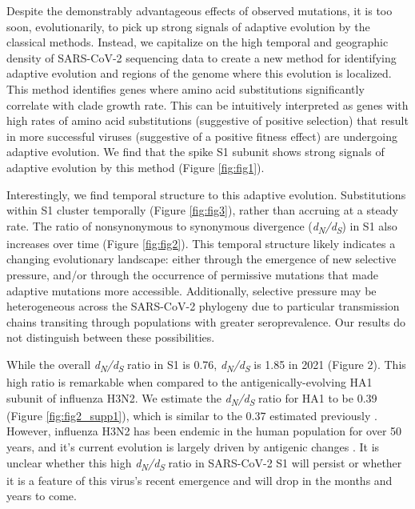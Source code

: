 \documentclass[11pt,oneside,letterpaper]{article}
\begin{document}
Despite the demonstrably advantageous effects of observed mutations, it is too soon, evolutionarily, to pick up strong signals of adaptive evolution by the classical methods. Instead, we capitalize on the high temporal and geographic density of SARS-CoV-2 sequencing data to create a new method for identifying adaptive evolution and regions of the genome where this evolution is localized. This method identifies genes where amino acid substitutions significantly correlate with clade growth rate. This can be intuitively interpreted as genes with high rates of amino acid substitutions (suggestive of positive selection) that result in more successful viruses (suggestive of a positive fitness effect) are undergoing adaptive evolution. We find that the spike S1 subunit shows strong signals of adaptive evolution by this method (Figure \ref{fig:fig1}).

Interestingly, we find temporal structure to this adaptive evolution. Substitutions within S1 cluster temporally (Figure \ref{fig:fig3}), rather than accruing at a steady rate. The ratio of nonsynonymous to synonymous divergence (\emph{d\textsubscript{N}/d\textsubscript{S}}) in S1 also increases over time (Figure \ref{fig:fig2}). This temporal structure likely indicates a changing evolutionary landscape: either through the emergence of new selective pressure, and/or through the occurrence of permissive mutations that made adaptive mutations more accessible. Additionally, selective pressure may be heterogeneous across the SARS-CoV-2 phylogeny due to particular transmission chains transiting through populations with greater seroprevalence. Our results do not distinguish between these possibilities.

 While the overall \emph{d\textsubscript{N}/d\textsubscript{S}} ratio in S1 is 0.76, \emph{d\textsubscript{N}/d\textsubscript{S}} is 1.85 in 2021 (Figure 2). This high ratio is remarkable when compared to the antigenically-evolving HA1 subunit of influenza H3N2. We estimate the \emph{d\textsubscript{N}/d\textsubscript{S}} ratio for HA1 to be 0.39 (Figure \ref{fig:fig2_supp1}), which is similar to the 0.37 estimated previously \cite{Wolf2006-vy}. However, influenza H3N2 has been endemic in the human population for over 50 years, and it’s current evolution is largely driven by antigenic changes \cite{Smith2004-if}. It is unclear whether this high \emph{d\textsubscript{N}/d\textsubscript{S}} ratio in SARS-CoV-2 S1 will persist or whether it is a feature of this virus’s recent emergence and will drop in the months and years to come.
\end{document}
